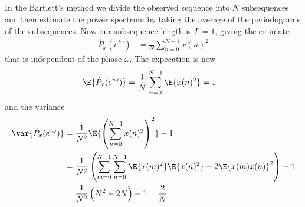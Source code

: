 \subsection{}

In the Bartlett's method we divide the observed sequence into $N$ subsequences
and then estimate the power spectrum by taking the average
of the periodograms of the subsequences. Now our subsequence length is $L=1$,
giving the estimate
\begin{align}
	\hat{P}_x(e^{i\omega})&=\frac{1}{N}\sum_{n=0}^{N-1}x(n)^2
\end{align}
that is independent of the phase $\omega$.
The expecation is now
\begin{align}
	\E{\hat{P}_x(e^{i\omega})}&=\frac{1}{N}\sum_{n=0}^{N-1}\E{x(n)^2}=1
\end{align}
and the variance
\begin{align}
	\var{\hat{P}_x(e^{i\omega})}&=\frac{1}{N^2}\E{\left(\sum_{n=0}^{N-1}x(n)^2\right)^2}-1\\
	&=\frac{1}{N^2}\left(\sum_{m=0}^{N-1}\sum_{n=0}^{N-1}\E{x(m)^2}\E{x(n)^2}+2\E{x(m)x(n)}^2\right)-1\\
	&=\frac{1}{N^2}\left(N^2+2N\right)-1=\frac{2}{N}
\end{align}








